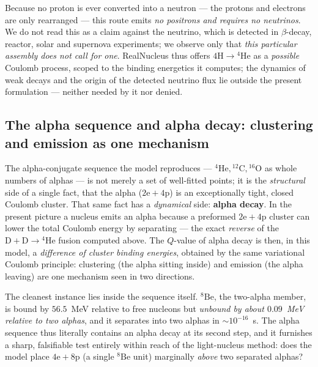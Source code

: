 \documentclass[11pt]{article}
\begin{document}
Because no proton is ever converted into a neutron --- the protons and electrons are only
rearranged --- this route emits \emph{no positrons and requires no neutrinos}. We do not read this
as a claim against the neutrino, which is detected in $\beta$-decay, reactor, solar and supernova
experiments; we observe only that \emph{this particular assembly does not call for one}.
RealNucleus thus offers $4\mathrm{H}\to{}^4\mathrm{He}$ as a \emph{possible} Coulomb process,
scoped to the binding energetics it computes; the dynamics of weak decays and the origin of the
detected neutrino flux lie outside the present formulation --- neither needed by it nor denied.

\subsection{The alpha sequence and alpha decay: clustering and emission as one mechanism}
\label{sec:alphadecay}

The alpha-conjugate sequence the model reproduces ---
$^4\mathrm{He},{}^{12}\mathrm{C},{}^{16}\mathrm{O}$ as whole numbers of alphas --- is not merely a
set of well-fitted points; it is the \emph{structural} side of a single fact, that the alpha
($\mathrm{2e}+\mathrm{4p}$) is an exceptionally tight, closed Coulomb cluster. That same fact has a
\emph{dynamical} side: \textbf{alpha decay}. In the present picture a nucleus emits an alpha because
a preformed $\mathrm{2e}+\mathrm{4p}$ cluster can lower the total Coulomb energy by separating ---
the exact \emph{reverse} of the $\mathrm{D}+\mathrm{D}\to{}^4\mathrm{He}$ fusion computed above.
The $Q$-value of alpha decay is then, in this model, a \emph{difference of cluster binding
energies}, obtained by the same variational Coulomb principle: clustering (the alpha sitting
inside) and emission (the alpha leaving) are one mechanism seen in two directions.

The cleanest instance lies inside the sequence itself. $^8\mathrm{Be}$, the two-alpha member, is
bound by $56.5$~MeV relative to free nucleons but \emph{unbound by about $0.09$~MeV relative to
two alphas}, and it separates into two alphas in $\sim\!10^{-16}$~s. The alpha sequence thus
literally contains an alpha decay at its second step, and it furnishes a sharp, falsifiable test
entirely within reach of the light-nucleus method: does the model place $\mathrm{4e}+\mathrm{8p}$
(a single $^8\mathrm{Be}$ unit) marginally \emph{above} two separated alphas?
\end{document}
